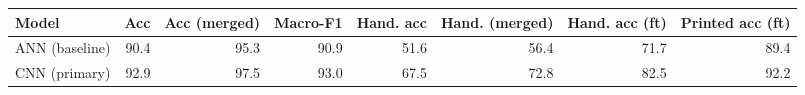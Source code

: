 \begin{tabular}{lrrrrrrr}
\toprule
Model & Acc & Acc (merged) & Macro-F1 & Hand. acc & Hand. (merged) & Hand. acc (ft) & Printed acc (ft) \\
\midrule
ANN (baseline) & 90.4 & 95.3 & 90.9 & 51.6 & 56.4 & 71.7 & 89.4 \\
CNN (primary) & 92.9 & 97.5 & 93.0 & 67.5 & 72.8 & 82.5 & 92.2 \\
\bottomrule
\end{tabular}
